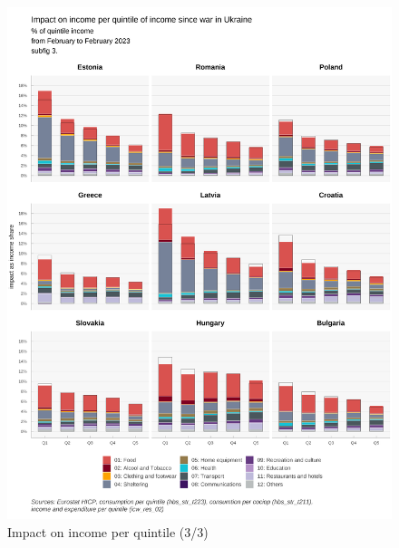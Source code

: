 \documentclass[
  9pt,
  a4paper,
  numbers=noendperiod,
  DIV=12]{scrartcl}
\begin{document}
\begin{figure}

\caption{Impact on income per quintile (3/3)}

{\centering \includegraphics{svg/coicop_l1_1y_3.png}

}

\end{figure}
\end{document}

